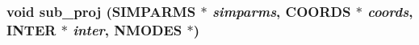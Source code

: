 \subsubsection{\setlength{\rightskip}{0pt plus 5cm}void sub\_\-proj ({\bf SIMPARMS} $\ast$ {\em simparms}, {\bf COORDS} $\ast$ {\em coords}, {\bf INTER} $\ast$ {\em inter}, {\bf NMODES} $\ast$)}\label{proto__main_8h_324ea0c1881e8924551fccc24449cf82}


